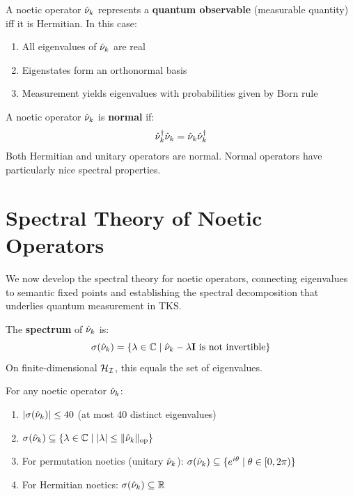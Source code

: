 \begin{corollary}
\label{cor:observable-noetics}
A noetic operator $\hat{\nu}_k$ represents a \textbf{quantum observable} (measurable quantity) iff it is Hermitian. In this case:
\begin{enumerate}
  \item All eigenvalues of $\hat{\nu}_k$ are real
  \item Eigenstates form an orthonormal basis
  \item Measurement yields eigenvalues with probabilities given by Born rule
\end{enumerate}
\end{corollary}

\begin{definition}
\label{def:normal-noetics}
A noetic operator $\hat{\nu}_k$ is \textbf{normal} if:
\[
\hat{\nu}_k^\dagger \hat{\nu}_k = \hat{\nu}_k \hat{\nu}_k^\dagger
\]
Both Hermitian and unitary operators are normal. Normal operators have particularly nice spectral properties.
\end{definition}

\section{Spectral Theory of Noetic Operators}
\label{sec:spectral-theory-ops}

We now develop the spectral theory for noetic operators, connecting eigenvalues to semantic fixed points and establishing the spectral decomposition that underlies quantum measurement in TKS.

\begin{definition}
\label{def:spectrum-noetic}
The \textbf{spectrum} of $\hat{\nu}_k$ is:
\[
\sigma(\hat{\nu}_k) = \{\lambda \in \mathbb{C} \mid \hat{\nu}_k - \lambda\mathbf{I} \text{ is not invertible}\}
\]
On finite-dimensional $\mathcal{H}_{\mathcal{I}}$, this equals the set of eigenvalues.
\end{definition}

\begin{proposition}
\label{prop:spectral-bounds}
For any noetic operator $\hat{\nu}_k$:
\begin{enumerate}
  \item $|\sigma(\hat{\nu}_k)| \leq 40$ (at most 40 distinct eigenvalues)
  \item $\sigma(\hat{\nu}_k) \subseteq \{\lambda \in \mathbb{C} \mid |\lambda| \leq \|\hat{\nu}_k\|_{\mathrm{op}}\}$
  \item For permutation noetics (unitary $\hat{\nu}_k$): $\sigma(\hat{\nu}_k) \subseteq \{e^{i\theta} \mid \theta \in [0, 2\pi)\}$
  \item For Hermitian noetics: $\sigma(\hat{\nu}_k) \subseteq \mathbb{R}$
\end{enumerate}
\end{proposition}

